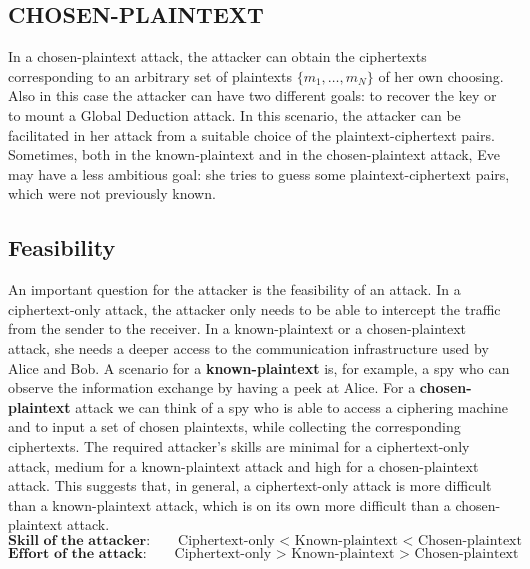 \documentclass[a4paper, 10pt, titlepage]{article}
\begin{document}
\subsection{CHOSEN-PLAINTEXT}
In a chosen-plaintext attack, the attacker can obtain the ciphertexts
corresponding to an arbitrary set of plaintexts $\{m_1, \dots, m_N\}$ of her own choosing. Also in this case the attacker can have two different goals: to recover the key or to mount a Global Deduction attack. In this scenario, the attacker can be facilitated in her attack from a suitable choice of the plaintext-ciphertext pairs.
Sometimes, both in the known-plaintext and in the chosen-plaintext attack, Eve may have a less ambitious goal: she tries to guess some plaintext-ciphertext pairs, which were not previously known.

\subsection{Feasibility}
An important question for the attacker is the feasibility of an attack. In a ciphertext-only attack, the attacker only needs to be able to intercept the traffic from the sender to the receiver.
In a known-plaintext or a chosen-plaintext attack, she needs a deeper
access to the communication infrastructure used by Alice and Bob.
A scenario for a \textbf{known-plaintext} is, for example, a spy who can observe the information exchange by having a peek at Alice.
For a \textbf{chosen-plaintext} attack we can think of a spy who is able to access a ciphering machine and to input a set of chosen plaintexts, while collecting the corresponding ciphertexts.
The required attacker’s skills are minimal for a ciphertext-only attack, medium for a known-plaintext attack and high for a chosen-plaintext attack. This suggests that, in general, a ciphertext-only attack is more difficult than a known-plaintext attack, which is on its own more difficult than a chosen-plaintext attack.
$$\textbf{Skill of the attacker:} \quad \quad \text{Ciphertext-only < Known-plaintext < Chosen-plaintext}$$
$$\textbf{Effort of the attack:} \quad \quad \text{Ciphertext-only > Known-plaintext > Chosen-plaintext}$$

\newpage
\end{document}
